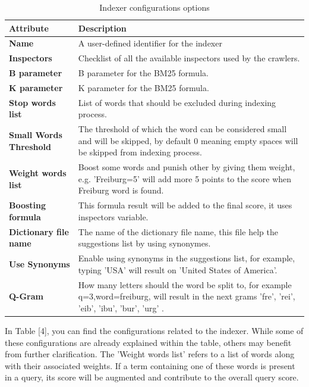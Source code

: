 \begin{table}[ht] 
{\footnotesize
\begin{tabular}{ P{2.5cm} ||P{11.1cm}  }      %
 \hline \hline
\textbf{Attribute} & \textbf{Description}\T\B 
\\ 
\hline
\textbf{Name} & A user-defined identifier for the indexer \T\B 
\\ 
\hline
\textbf{Inspectors} & Checklist of all the available inspectors used by the crawlers. \T\B 
\\ 
\hline
\textbf{B parameter} & B parameter for the BM25 formula. \T\B 
\\ 
\hline
\textbf{K parameter} & K parameter for the BM25 formula. \T\B 
\\ 
\hline
\textbf{Stop words list} & List of words that should be excluded during indexing process. \T\B 
\\ 
\hline
\textbf{Small Words Threshold} & The threshold of which the word can be considered small and will be skipped, by default 0 meaning empty spaces will be skipped from indexing process. \T\B 
\\ 
\hline
\textbf{Weight words list} & Boost some words and punish other by giving them weight, e.g. 'Freiburg=5' will add more 5 points to the score when Freiburg word is found. \T\B 
\\ 
\hline
\textbf{Boosting formula} & This formula result will be added to the final score, it uses inspectors variable. \T\B 
\\ 
\hline
\textbf{Dictionary file name} & The name of the dictionary file name, this file help the suggestions list by using synonymes. \T\B 
\\ 
\hline
\textbf{Use Synonyms} & Enable using synonyms in the suggestions list, for example, typing 'USA' will result on 'United States of America'. \T\B 
\\ 
\hline
\textbf{Q-Gram} & How many letters should the word be split to, for example q=3,word=freiburg, will result in the next grams { 'fre', 'rei', 'eib', 'ibu', 'bur', 'urg' }. \T\B 
\\ 
\hline \hline
    \end{tabular}
}
  \captionsetup{justification=centering,margin=2cm}
  \caption{Indexer configurations options}
\end{table}

In Table [4], you can find the configurations related to the indexer. While some of these configurations are already explained within the table, others may benefit from further clarification. The 'Weight words list' refers to a list of words along with their associated weights. If a term containing one of these words is present in a query, its score will be augmented and contribute to the overall query score.

